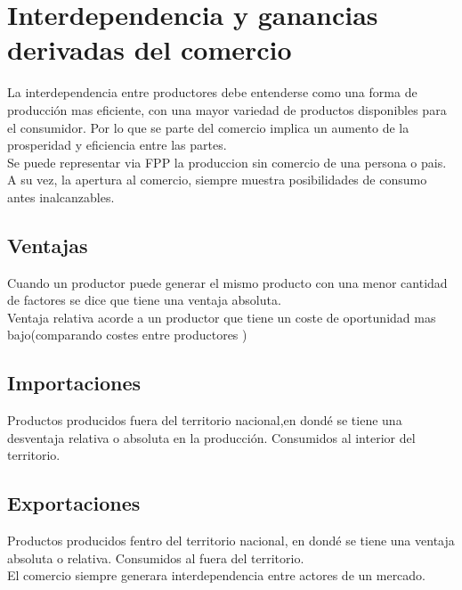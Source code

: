 \newpage
\section{Interdependencia y ganancias derivadas del comercio} La interdependencia entre productores debe entenderse como una forma de producción mas eficiente, con una mayor variedad de productos disponibles para el consumidor. Por lo que se parte del comercio implica un aumento de la prosperidad y eficiencia entre las partes. 
\\
Se puede representar via FPP la produccion sin comercio de una persona o pais. A su vez, la apertura al comercio, siempre muestra posibilidades de consumo antes inalcanzables. 
\subsection{Ventajas} Cuando un productor puede generar el mismo producto con una menor cantidad de factores se dice que tiene una ventaja absoluta.
\\
Ventaja relativa acorde a un productor que tiene un coste de oportunidad mas bajo(comparando costes entre productores )
\subsection{Importaciones} Productos producidos fuera del territorio nacional,en dondé se tiene una desventaja relativa o absoluta en la producción. Consumidos al interior del territorio. 
\subsection{Exportaciones} Productos producidos fentro del territorio nacional, en dondé se tiene una ventaja absoluta o relativa. Consumidos al fuera del territorio.
\\
El comercio siempre generara interdependencia entre actores de un mercado.

